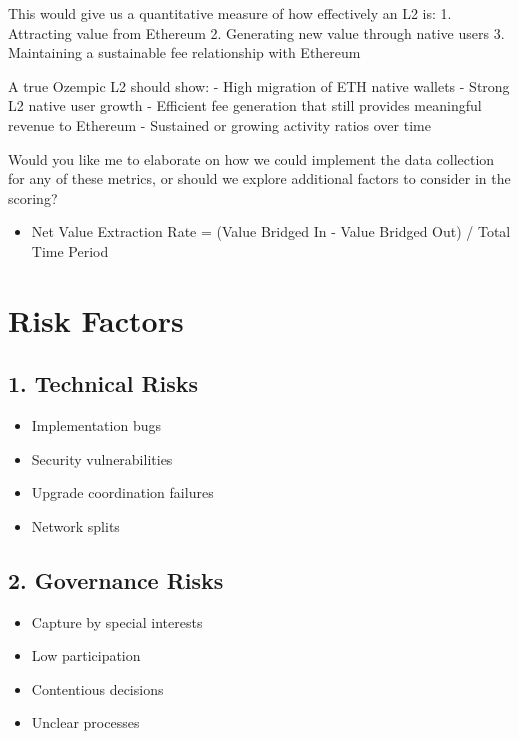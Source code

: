 \documentclass[
  letterpaper,
  DIV=11,
  numbers=noendperiod]{scrreprt}
\providecommand{\tightlist}{%
  \setlength{\itemsep}{0pt}\setlength{\parskip}{0pt}}\usepackage{longtable,booktabs,array}
\begin{document}
This would give us a quantitative measure of how effectively an L2 is:
1. Attracting value from Ethereum 2. Generating new value through native
users 3. Maintaining a sustainable fee relationship with Ethereum

A true Ozempic L2 should show: - High migration of ETH native wallets -
Strong L2 native user growth - Efficient fee generation that still
provides meaningful revenue to Ethereum - Sustained or growing activity
ratios over time

Would you like me to elaborate on how we could implement the data
collection for any of these metrics, or should we explore additional
factors to consider in the scoring?

\begin{itemize}
\tightlist
\item
  Net Value Extraction Rate = (Value Bridged In - Value Bridged Out) /
  Total Time Period
\end{itemize}

\section{Risk Factors}\label{risk-factors}

\subsection{1. Technical Risks}\label{technical-risks}

\begin{itemize}
\tightlist
\item
  Implementation bugs
\item
  Security vulnerabilities
\item
  Upgrade coordination failures
\item
  Network splits
\end{itemize}

\subsection{2. Governance Risks}\label{governance-risks}

\begin{itemize}
\tightlist
\item
  Capture by special interests
\item
  Low participation
\item
  Contentious decisions
\item
  Unclear processes
\end{itemize}
\end{document}
